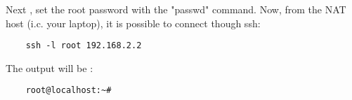 \begin{myitemize}
Next , set the root password with the "passwd" command.
Now, from the NAT host (i.c. your laptop), it is possible to connect though ssh:


\begin{tcolorbox}
    \begin{verbatim}
    ssh -l root 192.168.2.2 
    \end{verbatim}
\end{tcolorbox}

The output will be : 


    \begin{verbatim}
    root@localhost:~#
    \end{verbatim}

\end{myitemize}

